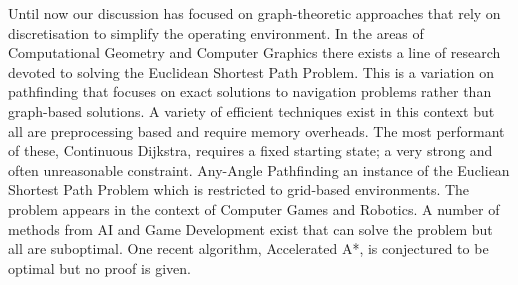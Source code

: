 Until now our discussion has focused on graph-theoretic approaches that rely on discretisation 
to simplify the operating environment. In the areas of Computational Geometry and Computer 
Graphics there exists a line of research devoted to solving the Euclidean Shortest Path
Problem. This is a variation on pathfinding that focuses on exact solutions to navigation 
problems rather than graph-based solutions. A variety of efficient techniques exist in this 
context but all are preprocessing based and require memory overheads. The most performant of 
these, Continuous Dijkstra, requires a fixed starting state; a very strong and often unreasonable 
constraint. 
Any-Angle Pathfinding an instance of the Eucliean Shortest Path Problem which is restricted
to grid-based environments. The problem appears in the context of Computer Games and Robotics.
A number of methods from AI and Game Development exist that can solve the problem but all
are suboptimal. One recent algorithm, Accelerated A*, is conjectured to be optimal but no
proof is given. 

